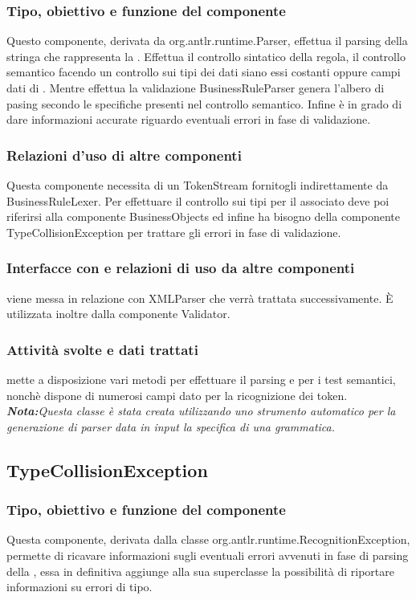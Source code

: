 \documentclass[11pt,titlepage,a4paper]{report}
\begin{document}
\subsubsection{Tipo, obiettivo e funzione del componente}
Questo componente, derivata da org.antlr.runtime.Parser, effettua il parsing della stringa che rappresenta la \br. Effettua il controllo sintatico della regola, il controllo semantico facendo un controllo sui tipi dei dati siano essi costanti oppure campi dati di \bos. Mentre effettua la validazione BusinessRuleParser genera l'albero di pasing secondo le specifiche presenti nel controllo semantico. Infine \`e in grado di dare informazioni accurate 
riguardo eventuali errori in fase di validazione.
\subsubsection{Relazioni d'uso di altre componenti}
Questa componente necessita di un TokenStream fornitogli indirettamente da BusinessRuleLexer. Per effettuare il controllo sui tipi per il \bo associato deve poi riferirsi alla componente BusinessObjects ed infine ha bisogno della componente TypeCollisionException per trattare gli errori in fase di validazione.
\subsubsection{Interfacce con e relazioni di uso da altre componenti}
\brp viene messa in relazione con XMLParser che verr\`a trattata successivamente.
\`E utilizzata inoltre dalla componente Validator.
\subsubsection{Attivit\`a svolte e dati trattati}
\brp mette a disposizione vari metodi per effettuare il parsing e per i test semantici, nonch\`e dispone di numerosi campi dato per la ricognizione dei token.\\
\textit{\textbf{Nota:}Questa classe \`e stata creata utilizzando uno strumento automatico per la generazione di parser data in input la specifica di una grammatica.}

\subsection{TypeCollisionException}
\subsubsection{Tipo, obiettivo e funzione del componente}
Questa componente, derivata dalla classe org.antlr.runtime.RecognitionException, permette di ricavare informazioni sugli eventuali errori avvenuti in fase di parsing della \br, essa in definitiva aggiunge alla sua superclasse la possibilit\`a di riportare informazioni su errori di tipo.
\end{document}
